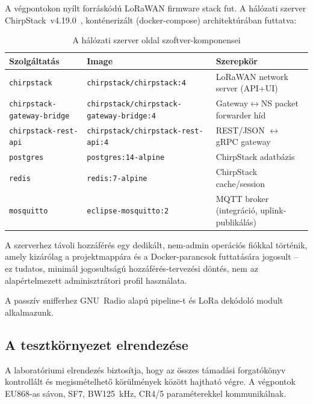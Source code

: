 \documentclass[12pt,a4paper]{article}
\begin{document}
A végpontokon nyílt forráskódú LoRaWAN firmware stack fut.
A hálózati szerver ChirpStack~v4.19.0~\cite{chirpstack}, konténerizált
(docker-compose) architektúrában futtatva:

\begin{table}[H]
\centering
\caption{A hálózati szerver oldal szoftver-komponensei}
\small
\begin{tabular}{@{}p{3.1cm}p{4.3cm}p{6.6cm}@{}}
\toprule
Szolgáltatás & Image & Szerepkör \\
\midrule
\texttt{chirpstack} & \texttt{chirpstack/chirpstack:4} & LoRaWAN network server (API+UI) \\
\texttt{chirpstack-gateway-bridge} & \texttt{chirpstack/chirpstack-gateway-bridge:4} & Gateway$\leftrightarrow$NS packet forwarder híd \\
\texttt{chirpstack-rest-api} & \texttt{chirpstack/chirpstack-rest-api:4} & REST/JSON $\leftrightarrow$ gRPC gateway \\
\texttt{postgres} & \texttt{postgres:14-alpine} & ChirpStack adatbázis \\
\texttt{redis} & \texttt{redis:7-alpine} & ChirpStack cache/session \\
\texttt{mosquitto} & \texttt{eclipse-mosquitto:2} & MQTT broker (integráció, uplink-publikálás) \\
\bottomrule
\end{tabular}
\end{table}

A szerverhez távoli hozzáférés egy dedikált, nem-admin operációs fiókkal
történik, amely kizárólag a projektmappára és a Docker-parancsok
futtatására jogosult -- ez tudatos, minimál jogosultságú
hozzáférés-tervezési döntés, nem az alapértelmezett adminisztrátori profil
használata.

A passzív snifferhez GNU~Radio alapú pipeline-t és LoRa dekódoló modult
alkalmazunk.

\subsection{A tesztkörnyezet elrendezése}

A laboratóriumi elrendezés biztosítja, hogy az összes támadási forgatókönyv
kontrollált és megismételhető körülmények között hajtható végre. A végpontok
EU868-as sávon, SF7, BW125~kHz, CR4/5 paraméterekkel kommunikálnak.
\end{document}
